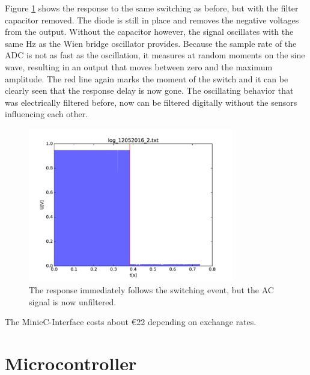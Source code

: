 Figure \ref{fig:swnocap} shows the response to the same switching as before, but with the filter capacitor removed. The diode is still in place and removes the negative voltages from the output. Without the capacitor however, the signal oscillates with the same \unit[1666]{Hz} as the Wien bridge oscillator provides. Because the sample rate of the ADC is not as fast as the oscillation, it measures at random moments on the sine wave, resulting in an output that moves between zero and the maximum amplitude. The red line again marks the moment of the switch and it can be clearly seen that the response delay is now gone. The oscillating behavior that was electrically filtered before, now can be filtered digitally without the sensors influencing each other.

\begin{figure}
	\begin{center}
		\includegraphics[width=0.8\textwidth]{images/switch_nocap.pdf} 
		\caption{The response immediately follows the switching event, but the AC signal is now unfiltered.}
		\label{fig:swnocap}
	\end{center}
\end{figure}

The MinieC-Interface costs about \euro{22} depending on exchange rates.

\section{Microcontroller} \label{uc}

